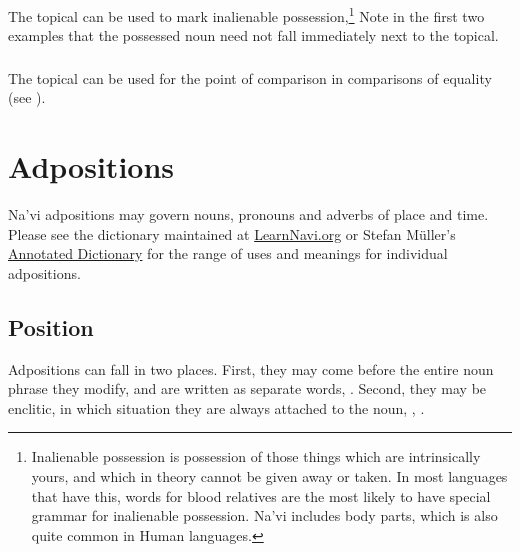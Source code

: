 \subsubsection{} The topical can be used to mark inalienable
possession,\footnote{Inalienable possession is possession of those
things which are intrinsically yours, and which in theory cannot be
given away or taken.  In most languages that have this, words for blood
relatives are the most likely to have special grammar for
inalienable possession.  Na'vi includes body parts, which is also
quite common in Human languages.}  
     Note in the first two examples that
the possessed noun need not fall immediately next to the topical.
\label{syn:topical:poss}

\subsubsection{} The topical can be used for the point of comparison
in comparisons of equality (see ).


\section{Adpositions}
\noindent Na'vi adpositions may govern nouns, pronouns and adverbs
of place and time.  Please see the dictionary maintained at
\href{https://learnnavi.org/navi-vocabulary/}{LearnNavi.org} or Stefan
Müller's 
\href{https://forum.learnnavi.org/projects/an-annotated-dictionary-(draft)/}{Annotated Dictionary}
for the range of uses and meanings for individual adpositions.

\subsection{Position} Adpositions can fall in two places.  First,
they may come before the entire noun phrase they modify, and are
written as separate words, 
  .  Second, they may
be enclitic, in which situation they are always attached to the noun,
 ,
 .\label{syn:adp:position}

